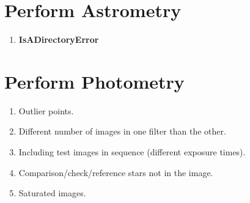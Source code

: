 \documentclass[11pt]{report}
\begin{document}
\section{Perform Astrometry}
\begin{enumerate}
\item {\bf IsADirectoryError}
\end{enumerate}
\section{Perform Photometry}
\begin{enumerate}
\item Outlier points.
\item Different number of images in one filter than the other.
\item Including test images in sequence (different exposure times).
\item Comparison/check/reference stars not in the image.
\item Saturated images.
\end{enumerate}

\end{document}
